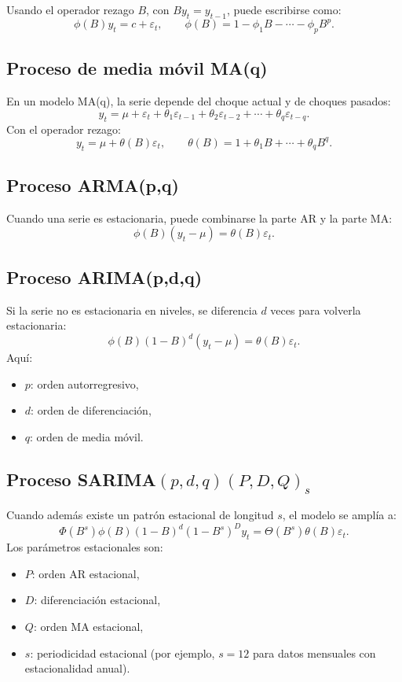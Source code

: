 \documentclass[12pt,a4paper]{article}
\begin{document}
Usando el operador rezago $B$, con $By_t = y_{t-1}$, puede escribirse como:
\[
\phi(B) y_t = c + \varepsilon_t,
\qquad
\phi(B)=1-\phi_1B-\cdots-\phi_pB^p.
\]

\subsection{Proceso de media móvil MA(q)}
En un modelo MA(q), la serie depende del choque actual y de choques pasados:
\[
y_t = \mu + \varepsilon_t + \theta_1 \varepsilon_{t-1} + \theta_2 \varepsilon_{t-2} + \cdots + \theta_q \varepsilon_{t-q}.
\]
Con el operador rezago:
\[
y_t = \mu + \theta(B)\varepsilon_t,
\qquad
\theta(B)=1+\theta_1B+\cdots+\theta_qB^q.
\]

\subsection{Proceso ARMA(p,q)}
Cuando una serie es estacionaria, puede combinarse la parte AR y la parte MA:
\[
\phi(B)(y_t-\mu)=\theta(B)\varepsilon_t.
\]

\subsection{Proceso ARIMA(p,d,q)}
Si la serie no es estacionaria en niveles, se diferencia $d$ veces para volverla estacionaria:
\[
\phi(B)(1-B)^d(y_t-\mu)=\theta(B)\varepsilon_t.
\]
Aquí:
\begin{itemize}
    \item $p$: orden autorregresivo,
    \item $d$: orden de diferenciación,
    \item $q$: orden de media móvil.
\end{itemize}

\subsection{Proceso SARIMA$(p,d,q)(P,D,Q)_s$}
Cuando además existe un patrón estacional de longitud $s$, el modelo se amplía a:
\[
\Phi(B^s)\phi(B)(1-B)^d(1-B^s)^D y_t
=
\Theta(B^s)\theta(B)\varepsilon_t.
\]
Los parámetros estacionales son:
\begin{itemize}
    \item $P$: orden AR estacional,
    \item $D$: diferenciación estacional,
    \item $Q$: orden MA estacional,
    \item $s$: periodicidad estacional (por ejemplo, $s=12$ para datos mensuales con estacionalidad anual).
\end{itemize}
\end{document}
